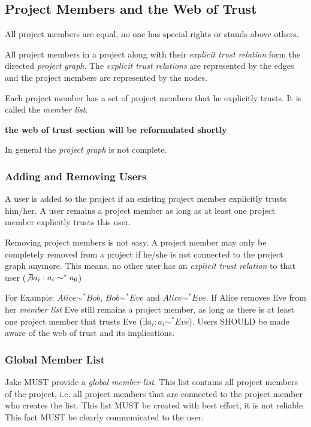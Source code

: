 \subsection{Project Members and the Web of Trust}
All project members are equal, no one has special rights or stands above others.

All project members in a project along with their \emph{explicit trust relation} form the directed \emph{project graph}. The \emph{explicit trust relations} are represented by the edges and the project members are represented by the nodes.

Each project member has a set of project members that he explicitly trusts. It is called the \emph{member list}. 

\textbf{the web of trust section will be reformulated shortly}

In general the \emph{project graph} is not complete.

\subsubsection{Adding and Removing Users}
A user is added to the project if an existing project member explicitly trusts him/her. A user remains a project member as long as at least one project member explicitly trusts this user.

Removing project members is not easy. A project member may only be completely removed from a project if he/she is not connected to the project graph anymore.
This means, no other user has an \emph{explicit trust relation} to that user ($\not\exists a_i: a_i \sim ^* a_0$)

For Example: $Alice \sim ^* Bob$, $Bob \sim ^* Eve$ and $Alice \sim ^* Eve$. If Alice removes Eve from her \emph{member list}  Eve still remains a project member, as long as there is at least one project member that trusts Eve ($\exists a_i: a_i \sim ^* Eve$). Users SHOULD be made aware of the web of trust and its implications. 

\subsubsection{Global Member List}
Jake MUST provide a \emph{global member list}. This list contains all project members of the project, i.e. all project members that are connected to the project member who creates the list. This list MUST be created with best effort, it is not reliable. This fact MUST be clearly communicated to the user. 

